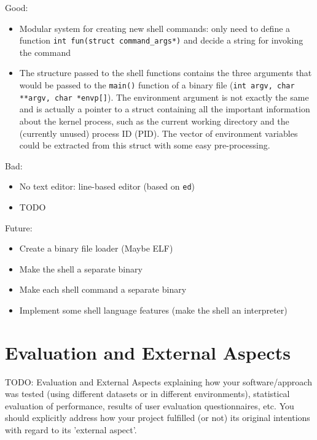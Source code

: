 \documentclass{article}
\begin{document}
Good:
\begin{itemize}
    \item Modular system for creating new shell commands: only need to define a
        function \texttt{int fun(struct command\_args*)} and decide a string for
        invoking the command
    \item The structure passed to the shell functions contains the three
        arguments that would be passed to the \texttt{main()} function of a
        binary file (\texttt{int argv, char **argv, char *envp[]}). The
        environment argument is not exactly the same and is actually a pointer
        to a struct containing all the important information about the kernel
        process, such as the current working directory and the (currently
        unused) process ID (PID). The vector of environment variables could be
        extracted from this struct with some easy pre-processing.
\end{itemize}
Bad:
\begin{itemize}
    \item No text editor: line-based editor (based on \texttt{ed})
    \item TODO
\end{itemize}
Future:
\begin{itemize}
    \item Create a binary file loader (Maybe ELF)
    \item Make the shell a separate binary
    \item Make each shell command a separate binary
    \item Implement some shell language features (make the shell an
        interpreter)
\end{itemize}

\section{Evaluation and External Aspects}
TODO: Evaluation and External Aspects explaining how your software/approach was
tested (using different datasets or in different environments), statistical
evaluation of performance, results of user evaluation questionnaires, etc. You
should explicitly address how your project fulfilled (or not) its original
intentions with regard to its 'external aspect'.
\end{document}
